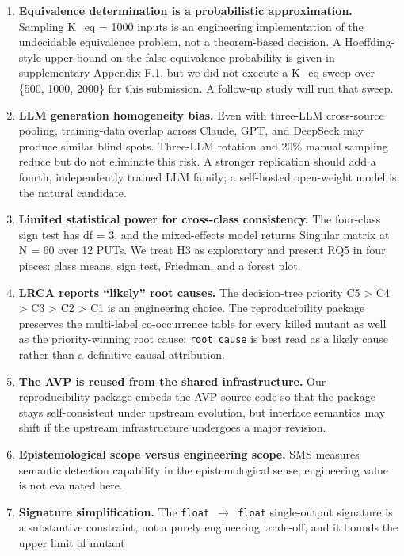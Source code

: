 \documentclass[manuscript,screen,review]{acmart}
\begin{document}
\begin{enumerate}
\item
  \textbf{Equivalence determination is a probabilistic approximation.}
  Sampling K\_eq = 1000 inputs is an engineering implementation of the
  undecidable equivalence problem, not a theorem-based decision. A
  Hoeffding-style upper bound on the false-equivalence probability is
  given in supplementary Appendix F.1, but we did not execute a K\_eq sweep over \{500, 1000, 2000\}
  for this submission. A follow-up study will run that sweep.
\item
  \textbf{LLM generation homogeneity bias.} Even with three-LLM
  cross-source pooling, training-data overlap across Claude, GPT, and
  DeepSeek may produce similar blind spots. Three-LLM rotation and 20\%
  manual sampling reduce but do not eliminate this risk. A stronger
  replication should add a fourth, independently trained LLM family; a
  self-hosted open-weight model is the natural candidate.
\item
  \textbf{Limited statistical power for cross-class consistency.} The
  four-class sign test has df = 3, and the mixed-effects model returns
  Singular matrix at N = 60 over 12 PUTs. We treat H3 as exploratory and
  present RQ5 in four pieces: class means, sign test, Friedman, and a
  forest plot.
\item
  \textbf{LRCA reports ``likely'' root causes.} The decision-tree
  priority C5 \textgreater{} C4 \textgreater{} C3 \textgreater{} C2
  \textgreater{} C1 is an engineering choice. The reproducibility
  package preserves the multi-label co-occurrence table for every killed
  mutant as well as the priority-winning root cause; \texttt{root\_cause}
  is best read as a likely cause rather than a definitive causal
  attribution.
\item
  \textbf{The AVP is reused from the shared infrastructure.} Our reproducibility package
  embeds the AVP source code so that the package stays self-consistent under upstream
  evolution, but interface semantics may shift if the upstream infrastructure undergoes a major
  revision.
\item
  \textbf{Epistemological scope versus engineering scope.} SMS measures
  semantic detection capability in the epistemological sense;
  engineering value is not evaluated here.
\item
  \textbf{Signature simplification.} The \texttt{float\ $\to$\ float}
  single-output signature is a substantive constraint, not a purely
  engineering trade-off, and it bounds the upper limit of mutant

\end{enumerate}
\end{document}
